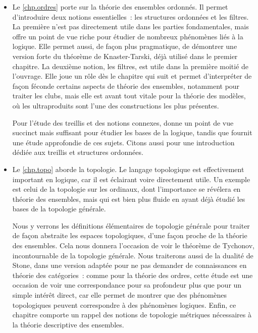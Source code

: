 \begin{itemize}
  Comme pour le chapitre précédent, le sujet est abordé dans la majorité des
  ouvrages.
  
\item Le \cref{chp.ordres} porte sur la théorie des ensembles ordonnés. Il
  permet d'introduire deux notions essentielles~: les structures ordonnées et
  les filtres. La première n'est pas directement utile dans les parties
  fondamentales, mais offre un point de vue riche pour étudier de nombreux
  phénomènes liés à la logique. Elle permet aussi, de façon plus pragmatique, de
  démontrer une version forte du théorème de Knaster-Tarski, déjà
  utilisé dans le premier chapitre. La deuxième notion, les filtres, est utile
  dans la première moitié de l'ouvrage. Elle joue un rôle dès le chapitre qui
  suit et permet d'interpréter de façon féconde certains aspects de théorie des
  ensembles, notamment pour traiter les clubs, mais elle est avant tout
  vitale pour la théorie des modèles, où les ultraproduits sont l'une des
  constructions les plus présentes.

  Pour l'étude des treillis et des notions connexes, \cite{Cori2003}
  donne un point de vue succinct mais suffisant pour étudier les bases de la
  logique, tandis que \cite{Gratzer2011} fournit une étude approfondie de ces
  sujets. Citons aussi \cite{Rutherford1965} pour une introduction dédiée
  aux treillis et structures ordonnées.
  
\item Le \cref{chp.topo} aborde la topologie. Le langage topologique est
  effectivement important en logique, car il est éclairant voire directement
  utile. Un exemple est celui de la topologie sur les ordinaux, dont
  l'importance se révélera en théorie des ensembles, mais qui est bien plus
  fluide en ayant déjà étudié les bases de la topologie générale.

  Nous y verrons les définitions élémentaires de topologie générale pour traiter
  de façon abstraite les espaces topologiques, d'une façon proche de la théorie
  des ensembles. Cela nous donnera l'occasion de voir le théorème de
  Tychonov, incontournable de la topologie générale. Nous traiterons
  aussi de la dualité de Stone, dans une version adaptée pour ne pas
  demander de connaissances en théorie des catégories~: comme pour la théorie
  des ordres, cette étude est une occasion de voir une correspondance pour sa
  profondeur plus que pour un simple intérêt direct, car elle permet de montrer
  que des phénomènes topologiques peuvent correspondre à des phénomènes
  logiques. Enfin, ce chapitre comporte un rappel des notions de topologie
  métriques nécessaires à la théorie descriptive des ensembles.


\end{itemize}
